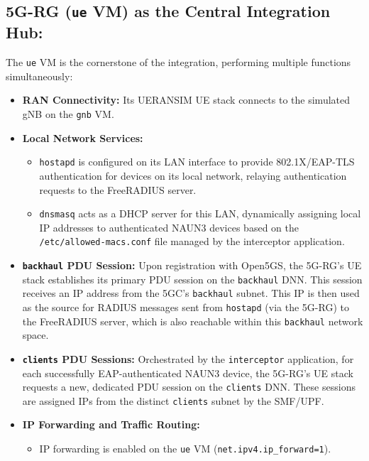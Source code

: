 \subsection{\ac{5G-RG} (\texttt{ue} \ac{VM}) as the Central Integration Hub:}

The \texttt{ue} \ac{VM} is the cornerstone of the integration, performing multiple functions simultaneously:

\begin{itemize}
    \item \textbf{\ac{RAN} Connectivity:} Its UERANSIM \ac{UE} stack connects to the simulated \ac{gNB} on the \texttt{gnb} VM.

    \item{
        \textbf{Local Network Services:}
        \begin{itemize}
            \item \texttt{hostapd} is configured on its \ac{LAN} interface to provide 802.1X/\ac{EAP-TLS} authentication for devices on its local network, relaying authentication requests to the FreeRADIUS server.

            \item \texttt{dnsmasq} acts as a \ac{DHCP} server for this \ac{LAN}, dynamically assigning local \ac{IP} addresses to authenticated \ac{NAUN3} devices based on the \texttt{/etc/allowed-macs.conf} file managed by the interceptor application.
        \end{itemize}
    }

    \item \textbf{\texttt{backhaul} \ac{PDU} Session:} Upon registration with Open5GS, the \ac{5G-RG}'s \ac{UE} stack establishes its primary \ac{PDU} session on the \texttt{backhaul} \ac{DNN}. This session receives an \ac{IP} address from the \ac{5GC}'s \texttt{backhaul} subnet. This \ac{IP} is then used as the source for \ac{RADIUS} messages sent from \texttt{hostapd} (via the \ac{5G-RG}) to the FreeRADIUS server, which is also reachable within this \texttt{backhaul} network space.

    \item \textbf{\texttt{clients} \ac{PDU} Sessions:} Orchestrated by the \texttt{interceptor} application, for each successfully \ac{EAP}-authenticated \ac{NAUN3} device, the \ac{5G-RG}'s \ac{UE} stack requests a new, dedicated \ac{PDU} session on the \texttt{clients} \ac{DNN}. These sessions are assigned \acp{IP} from the distinct \texttt{clients} subnet by the \ac{SMF}/\ac{UPF}.

    \item{
        \textbf{\ac{IP} Forwarding and Traffic Routing:}
        \begin{itemize}
            \item \ac{IP} forwarding is enabled on the \texttt{ue} \ac{VM} (\texttt{net.ipv4.ip\_forward=1}).


\end{itemize}}
\end{itemize}
